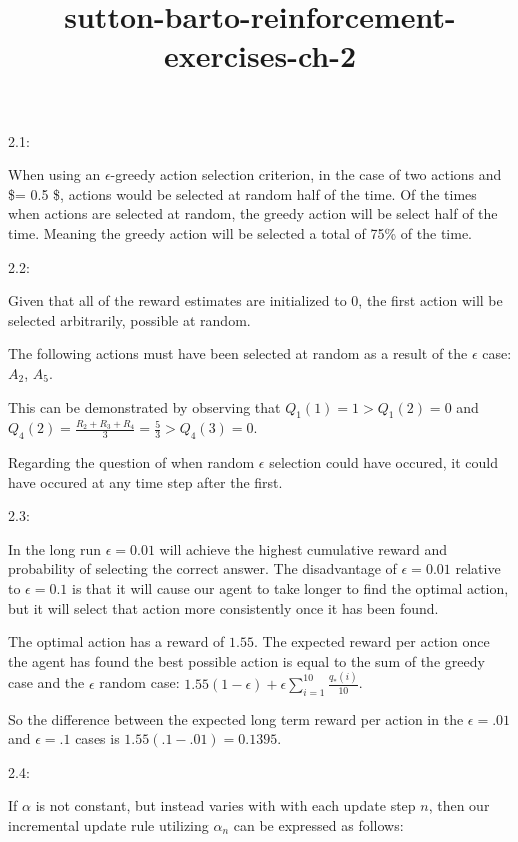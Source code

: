 \documentclass[11pt]{article}
\title{sutton-barto-reinforcement-exercises-ch-2}
\begin{document}
    
    
    \maketitle
    
    

    
    2.1:

When using an \(\epsilon\)-greedy action selection criterion, in the
case of two actions and \$\epsilon = 0.5 \$, actions would be selected
at random half of the time. Of the times when actions are selected at
random, the greedy action will be select half of the time. Meaning the
greedy action will be selected a total of 75\% of the time.

2.2:

Given that all of the reward estimates are initialized to 0, the first
action will be selected arbitrarily, possible at random.

The following actions must have been selected at random as a result of
the \(\epsilon\) case: \(A_2\), \(A_5\).

This can be demonstrated by observing that \(Q_1(1) = 1 > Q_1(2) = 0\)
and \(Q_4(2) = \frac{R_2 + R_3 + R_4}{3} = \frac{5}{3} > Q_4(3) = 0\).

Regarding the question of when random \(\epsilon\) selection could have
occured, it could have occured at any time step after the first.

2.3:

In the long run \(\epsilon=0.01\) will achieve the highest cumulative
reward and probability of selecting the correct answer. The disadvantage
of \(\epsilon=0.01\) relative to \(\epsilon=0.1\) is that it will cause
our agent to take longer to find the optimal action, but it will select
that action more consistently once it has been found.

The optimal action has a reward of \(1.55\). The expected reward per
action once the agent has found the best possible action is equal to the
sum of the greedy case and the \(\epsilon\) random case:
\(1.55 (1 - \epsilon) + \epsilon \sum^{10}_{i=1}\frac{q_*(i)}{10}\).

So the difference between the expected long term reward per action in
the \(\epsilon = .01\) and \(\epsilon = .1\) cases is
\(1.55(.1 - .01) = 0.1395\).

2.4:

If \(\alpha\) is not constant, but instead varies with with each update
step \(n\), then our incremental update rule utilizing \(\alpha_n\) can
be expressed as follows:
\end{document}
